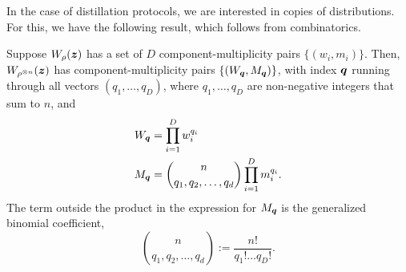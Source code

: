 \documentclass[pra,
aps,
twocolumn,
superscriptaddress,
groupedaddress,
nofootinbib,
reprint
]{revtex4-1}
\begin{document}
In the case of distillation protocols, we are interested in copies of distributions. 
For this, we have the following result, which follows from combinatorics.
\begin{lemma}\label{lem:ncopycomponents}
	Suppose $W_\rho(\bm{z})$ has a set of $D$ component-multiplicity pairs $\{(w_i, m_i)\}$. Then, $W_{\rho^{\otimes n}} (\bm{z})$ has component-multiplicity pairs $\{(W_{\boldsymbol{q}}, M_{\boldsymbol{q}})\}$, with index $\boldsymbol{q}$ running through all vectors $(q_1, \dots, q_D)$, where $q_1, \dots, q_D$ are non-negative integers that sum to $n$, and
\begin{align}
	W_{\boldsymbol{q}} &= \prod_{i=1}^D w_i^{q_i} \label{eq:W}\\
	M_{\boldsymbol{q}} &= \binom{n}{q_1,q_2, \dots, q_d} \prod_{i=1}^D m_i^{q_i}. \label{eq:M}
\end{align}
The term outside the product in the expression for $M_{\boldsymbol{q}}$ is the generalized binomial coefficient,
\begin{equation}
	\binom{n}{q_1,q_2, \dots, q_d} := \frac{n!}{q_1!\dots q_D!}.
\end{equation}
\end{lemma}
\end{document}
